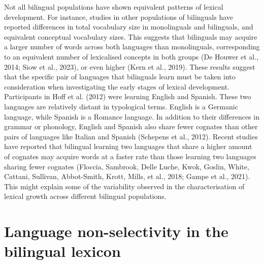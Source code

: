 \documentclass[
  12pt,
  b5paperpaper,
  twoside]{scrreprt}
\begin{document}
Not all bilingual populations have shown equivalent patterns of lexical
development. For instance, studies in other populations of bilinguals
have reported differences in total vocabulary size in monolinguals and
bilinguals, and equivalent conceptual vocabulary sizes. This suggests
that bilinguals may acquire a larger number of words across both
languages than monolinguals, corresponding to an equivalent number of
lexicalised concepts in both groups (De Houwer et al., 2014; Siow et
al., 2023), or even higher (Kern et al., 2019). These results suggest
that the specific pair of languages that bilinguals learn must be taken
into consideration when investigating the early stages of lexical
development. Participants in Hoff et al. (2012) were learning English
and Spanish. These two languages are relatively distant in typological
terms. English is a Germanic language, while Spanish is a Romance
language. In addition to their differences in grammar or phonology,
English and Spanish also share fewer cognates than other pairs of
languages like Italian and Spanish (Schepens et al., 2012). Recent
studies have reported that bilingual learning two languages that share a
higher amount of cognates may acquire words at a faster rate than those
learning two languages sharing fewer cognates (Floccia, Sambrook, Delle
Luche, Kwok, Goslin, White, Cattani, Sullivan, Abbot-Smith, Krott,
Mills, et al., 2018; Gampe et al., 2021). This might explain some of the
variability observed in the characterisation of lexical growth across
different bilingual populations.

\hypertarget{language-non-selectivity-in-the-bilingual-lexicon}{%
\section{Language non-selectivity in the bilingual
lexicon}\label{language-non-selectivity-in-the-bilingual-lexicon}}
\end{document}
